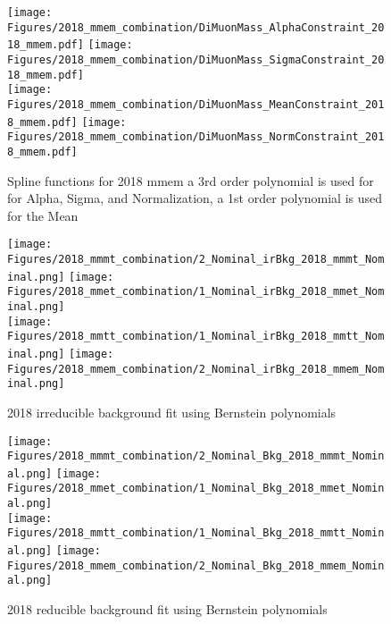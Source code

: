 \begin{figure}[ht!b]
    \centering 
    \texttt{[image: Figures/2018\_mmem\_combination/DiMuonMass\_AlphaConstraint\_2018\_mmem.pdf]}
    \texttt{[image: Figures/2018\_mmem\_combination/DiMuonMass\_SigmaConstraint\_2018\_mmem.pdf]}\\
    \texttt{[image: Figures/2018\_mmem\_combination/DiMuonMass\_MeanConstraint\_2018\_mmem.pdf]}
    \texttt{[image: Figures/2018\_mmem\_combination/DiMuonMass\_NormConstraint\_2018\_mmem.pdf]}\\
    \caption{\label{fig:spline_2018_mmem} Spline functions for 2018 mmem a 3rd order polynomial is used for  for Alpha, Sigma, and Normalization, a 1st order polynomial is used for the Mean}
\end{figure}

\begin{figure}[ht!b]
  \centering
  \texttt{[image: Figures/2018\_mmmt\_combination/2\_Nominal\_irBkg\_2018\_mmmt\_Nominal.png]}
  \texttt{[image: Figures/2018\_mmet\_combination/1\_Nominal\_irBkg\_2018\_mmet\_Nominal.png]}\\
  \texttt{[image: Figures/2018\_mmtt\_combination/1\_Nominal\_irBkg\_2018\_mmtt\_Nominal.png]}
  \texttt{[image: Figures/2018\_mmem\_combination/2\_Nominal\_irBkg\_2018\_mmem\_Nominal.png]}\\
    \caption{\label{fig:2018_fit_ZZ} 2018 irreducible background fit using Bernstein polynomials}
\end{figure}
\begin{figure}[ht!b]
  \centering
  \texttt{[image: Figures/2018\_mmmt\_combination/2\_Nominal\_Bkg\_2018\_mmmt\_Nominal.png]}
  \texttt{[image: Figures/2018\_mmet\_combination/1\_Nominal\_Bkg\_2018\_mmet\_Nominal.png]}\\
  \texttt{[image: Figures/2018\_mmtt\_combination/1\_Nominal\_Bkg\_2018\_mmtt\_Nominal.png]}
  \texttt{[image: Figures/2018\_mmem\_combination/2\_Nominal\_Bkg\_2018\_mmem\_Nominal.png]}\\
    \caption{\label{fig:2018_fit_FF} 2018 reducible background fit using Bernstein polynomials}
\end{figure}
